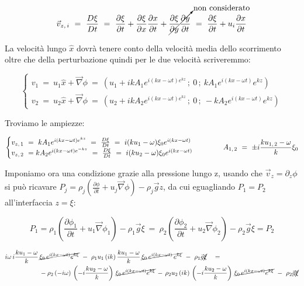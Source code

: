 \[\vec v_{z,\, i}\ =\ \frac{D \xi}{D t}\ =\ \frac{\partial \xi}{\partial t} + \frac{\partial \xi}{\partial x}\frac{\partial x}{\partial t} + \cancelto{\text{non considerato}}{\frac{\partial \xi}{\partial y}\frac{\partial y}{\partial t}}\ =\ \frac{\partial \xi}{\partial t} + u_i \frac{\partial x}{\partial t}\]

La velocità lungo $\hat x$ dovrà tenere conto della velocità media dello scorrimento oltre che della perturbazione quindi per le due velocità scriveremmo:

\[\begin{cases} 
	v_1\ =\ u_1 \hat x + \vec \nabla \phi\ =\  (u_1 + ikA_1 e^{i(kx-\omega t)e^{kz}}\,;\ 0\,;\ kA_1 e^{i(kx-\omega t)}e^{kz} )\\ 
	v_2\ =\ u_2 \hat x + \vec \nabla \phi\ =\ (u_2 + ikA_2 e^{i(kx-\omega t)e^{kz}}\,;\ 0\,;\ -kA_2 e^{i(kx-\omega t)}e^{kz})
\end{cases}\]

Troviamo le ampiezze:

\[\begin{cases} 
	v_{z,\, 1}\ =\ kA_1 e^{i(kx-\omega t)e^{kz}}\ =\ \frac{D\xi}{Dt}\ =\ i(ku_1-\omega)\xi_0 e^{i(kx-\omega t)}\\ 
	v_{z,\, 2}\ =\-kA_2 e^{i(kx-\omega t)e^{-kz}}\ =\ \frac{D\xi}{Dt}\ =\ i(ku_2-\omega)\xi_0 e^{i(kx-\omega t)}
\end{cases}
\qquad \quad
A_{1,\, 2}\ =\ \pm i \frac{k u_{1,\, 2}-\omega}{k} \xi_0
\]


Imponiamo ora una condizione grazie alla pressione lungo z, usando che $\vec v_z =\partial_z \phi$ si può ricavare $P_j=\rho_j (\frac{\partial \phi}{\partial t} + u_j \vec \nabla \phi)-\rho_j \vec g z$, da cui eguagliando $P_1=P_2$ all'interfaccia $z=\xi$:

\[P_1=\rho_1 \left(\frac{\partial \phi_1}{\partial t} + u_1 \vec \nabla \phi_1\right)-\rho_1 \vec g \xi\ =\ \rho_2 \left(\frac{\partial \phi_2}{\partial t} + u_2 \vec \nabla \phi_2\right)-\rho_2 \vec g \xi = P_2\]

\[\begin{aligned}
i\omega\, i\frac{ku_1-\omega}{k}\, &\cancel{\xi_0 \,e^{i(kx-\omega t)}e^{k\xi}}\ -\ \rho_1 u_1\, (ik)\, \frac{ku_1-\omega}{k}\, \cancel{\xi_0 \,e^{i(kx-\omega t)}\,e^{k\xi}}\ -\ \rho_1 \vec g \cancel{\xi}\quad =\\ 
&-\rho_2\, (-i\omega)\, \left(-i\frac{ku_2-\omega}{k} \right)\, \cancel{\xi_0\, e^{i(kx-\omega t)}e^{k\xi}}\, -\, \rho_2 u_2\, (ik)\, \left(-i\frac{ku_2-\omega}{k}\right)\, \cancel{\xi_0\, e^{i(kx-\omega t)}e^{k\xi}}\ -\ \rho_2 \vec g \cancel{\xi}
\end{aligned}\]

